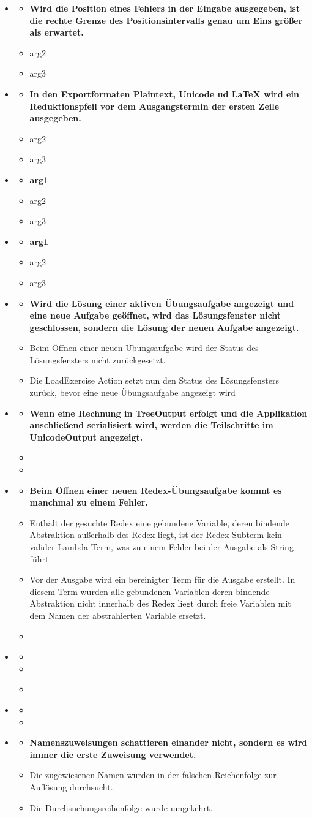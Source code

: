 \documentclass[parskip=full,11pt,openany]{scrreprt}
\begin{document}
\begin{itemize}[itemsep=3ex]

\newcommand{\issue}[3]{%
\item[]
\begin{itemize}[noitemsep]
\item[]\textbf{#1}
\item[\textbf{Grund:}]#2
\item[\textbf{Behebung:}]#3
\end{itemize}}

\issue{Wird die Position eines Fehlers in der Eingabe ausgegeben, ist die rechte Grenze des Positionsintervalls genau um Eins größer als erwartet.}
{arg2}{arg3}

\issue{In den Exportformaten Plaintext, Unicode ud LaTeX wird ein Reduktionspfeil vor dem Ausgangstermin der ersten Zeile ausgegeben.}
{arg2}{arg3}



\issue{arg1}{arg2}{arg3}

\issue{arg1}{arg2}{arg3}

\issue{Wird die Lösung einer aktiven Übungsaufgabe angezeigt und eine neue Aufgabe geöffnet, wird das Lösungsfenster nicht geschlossen, sondern die Lösung der neuen Aufgabe angezeigt. }
{Beim Öffnen einer neuen Übungsaufgabe wird der Status des Lösungsfensters nicht zurückgesetzt.}
{Die LoadExercise Action setzt nun den Status des Lösungsfensters zurück, bevor eine neue Übungsaufgabe angezeigt wird}

\issue{Wenn eine Rechnung in TreeOutput erfolgt und die Applikation anschließend serialisiert wird, werden die Teilschritte im UnicodeOutput angezeigt.}
{}
{}

\issue{Beim Öffnen einer neuen Redex-Übungsaufgabe kommt es manchmal zu einem Fehler.}
{Enthält der gesuchte Redex eine gebundene Variable, deren bindende Abstraktion außerhalb des Redex liegt, ist der Redex-Subterm kein valider Lambda-Term, was zu einem Fehler bei der Ausgabe als String führt.}
{Vor der Ausgabe wird ein bereinigter Term für die Ausgabe erstellt. In diesem Term wurden alle gebundenen Variablen deren bindende Abstraktion nicht innerhalb des Redex liegt durch freie Variablen mit dem Namen der abstrahierten Variable ersetzt.}

\issue{}{}{}

\issue{}{}{}

\issue{Namenszuweisungen schattieren einander nicht, sondern es wird immer die erste Zuweisung verwendet.}
{Die zugewiesenen Namen wurden in der falschen Reiehenfolge zur Auflösung durchsucht.}
{Die Durchsuchungsreihenfolge wurde umgekehrt.}


\end{itemize}
\end{document}
